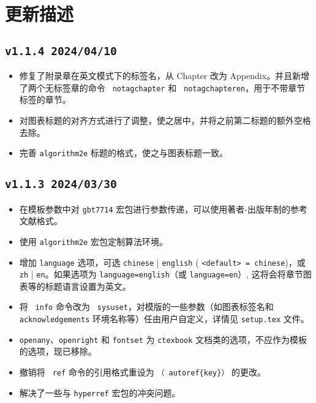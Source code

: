\chapter{更新描述}

\section*{\texttt{v1.1.4 2024/04/10}}
\begin{itemize}
    \item 修复了附录章在英文模式下的标签名，从 Chapter 改为 Appendix。并且新增了两个无标签章的命令 \texttt{ notagchapter} 和 \texttt{ notagchapteren}，用于不带章节标签的章节。
    \item 对图表标题的对齐方式进行了调整，使之居中，并将之前第二标题的额外空格去除。
    \item 完善 \texttt{algorithm2e} 标题的格式，使之与图表标题一致。
\end{itemize}

\section*{\texttt{v1.1.3 2024/03/30}}
\begin{itemize}
    \item 在模板参数中对 \texttt{gbt7714} 宏包进行参数传递，可以使用著者-出版年制的参考文献格式。
    \item 使用 \texttt{algorithm2e} 宏包定制算法环境。
    \item 增加 \texttt{language} 选项，可选 \texttt{chinese} | \texttt{english} ( \texttt{<default> = chinese})，或 \texttt{zh} | \texttt{en}。如果选项为 \texttt{language=english}（或 \texttt{language=en}）, 这将会将章节图表等的标题语言设置为英文。
    \item 将 \texttt{ info} 命令改为 \texttt{ sysuset}，对模版的一些参数（如图表标签名和 \\ \texttt{acknowledgements} 环境名称等）任由用户自定义，详情见 \texttt{setup.tex} 文件。
    \item \texttt{openany}、\texttt{openright} 和 \texttt{fontset} 为 \texttt{ctexbook} 文档类的选项，不应作为模板的选项，现已移除。
    \item 撤销将 \texttt{ ref} 命令的引用格式重设为 \texttt{（ autoref\{key\}）} 的更改。
    \item 解决了一些与 \texttt{hyperref} 宏包的冲突问题。
\end{itemize}

